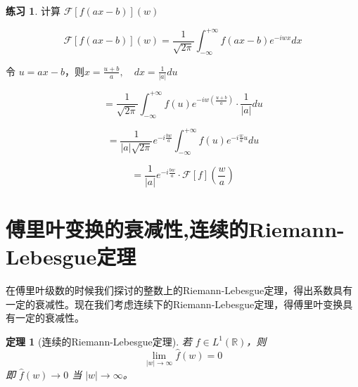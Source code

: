 \documentclass[12pt,a4paper]{article}
\theoremstyle{plain}
\newtheorem{theorem}{定理}[section]
\theoremstyle{definition}
\newtheorem{exercise}{练习}[section]  %
\theoremstyle{remark}
\begin{document}
	\begin{exercise}
		计算 $\mathcal{F}\left[ f(ax-b) \right](w)$
		
		\[
		\mathcal{F}\left[ f(ax-b) \right](w) = \frac{1}{\sqrt{2\pi}} \int_{-\infty}^{+\infty} f(ax-b) e^{-iwx} dx
		\]
		
		令 $u = ax - b$，则$x = \frac{u + b}{a}, \quad dx = \frac{1}{|a|}du$
		
		\[
		= \frac{1}{\sqrt{2\pi}} \int_{-\infty}^{+\infty} f(u) e^{-iw\left(\frac{u+b}{a}\right)} \cdot \frac{1}{|a|}du
		\]
		
		\[
		= \frac{1}{|a|\sqrt{2\pi}} e^{-i\frac{bw}{a}} \int_{-\infty}^{+\infty} f(u) e^{-i\frac{w}{a}u} du
		\]
		
		\[
		= \frac{1}{|a|} e^{-i\frac{bw}{a}} \cdot \mathcal{F}[f]\left( \frac{w}{a} \right)
		\]
	\end{exercise}
	
	\section{傅里叶变换的衰减性,连续的Riemann-Lebesgue定理}
	
	在傅里叶级数的时候我们探讨的整数上的Riemann-Lebesgue定理，得出系数具有一定的衰减性。现在我们考虑连续下的Riemann-Lebesgue定理，得傅里叶变换具有一定的衰减性。
	
	\begin{theorem}[连续的Riemann-Lebesgue定理]
		若 \( f \in L^1(\mathbb{R}) \)，则
		\[
		\lim_{|w| \to \infty} \hat{f}(w) = 0
		\]
		即 \( \hat{f}(w) \to 0 \) 当 \( |w| \to \infty \)。
	\end{theorem}
	
	
	
\end{document}
